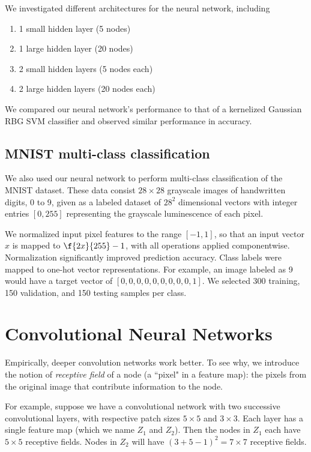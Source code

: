 \documentclass{article}
\begin{document}
\begin{multicols}{2}
We investigated different architectures for the neural network, including
\begin{enumerate}
\item 1 small hidden layer (5 nodes)
\item 1 large hidden layer (20 nodes)
\item 2 small hidden layers (5 nodes each)
\item 2 large hidden layers (20 nodes each)
\end{enumerate}

We compared our neural network's performance to that of a kernelized
Gaussian RBG SVM classifier and observed similar performance in accuracy.

\subsection{MNIST multi-class classification}

We also used our neural network to perform multi-class classification of the
MNIST dataset. These data consist $28\times 28$ grayscale images of handwritten
digits, 0 to 9, given as a labeled dataset of $28^2$ dimensional vectors
with integer entries $[0,255]$ representing the grayscale luminescence of each pixel.

We normalized input pixel features to the range $[-1, 1]$,
so that an input vector $x$ is mapped to $\f{2x}{255}-1$,
with all operations applied componentwise. Normalization significantly
improved prediction accuracy. Class labels were mapped to one-hot vector 
representations. For example, an image labeled as 9 would have a 
target vector of $[0,0,0,0,0,0,0,0,0,1]$.
We selected 300 training, 150 validation, and 150 testing samples per class.


\section{Convolutional Neural Networks}


Empirically, deeper convolution networks work better.
To see why, we introduce the notion of \emph{receptive field}
of a node (a ``pixel" in a feature map):
the pixels from the original image that contribute information
to the node.

For example,
suppose we have a convolutional network
with two successive convolutional layers,
with respective patch sizes $5\times 5$ and $3\times 3$.
Each layer has a single feature map (which we name $Z_1$ and $Z_2$).
Then the nodes in $Z_1$ each have $5\times 5$ receptive fields.
Nodes in $Z_2$ will have $(3 + 5 - 1)^2 = 7\times 7$ receptive fields.


\end{multicols}
\end{document}
